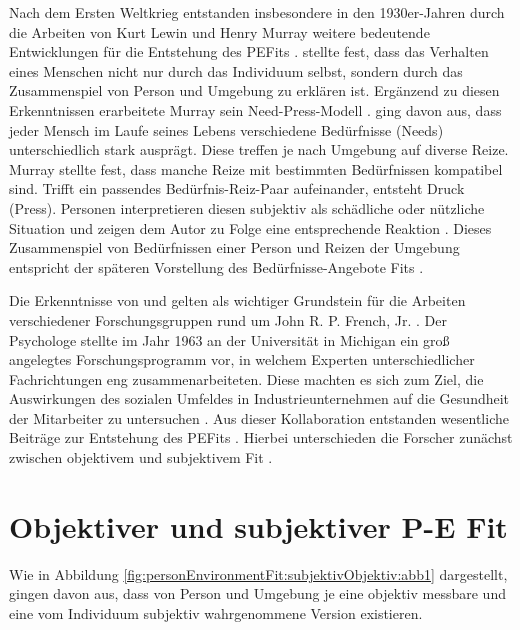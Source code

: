 Nach dem Ersten Weltkrieg entstanden insbesondere in den 1930er-Jahren durch die Arbeiten von Kurt Lewin und Henry Murray weitere bedeutende Entwicklungen für die Entstehung des \acp{PEFit} \cite[S. 1]{edwards:1990}\cite[S. 5]{caplan:1993}. \textcite[S. 11f.]{lewin:1936} stellte fest, dass das Verhalten eines Menschen nicht nur durch das Individuum selbst, sondern durch das Zusammenspiel von Person und Umgebung zu erklären ist. Ergänzend zu diesen Erkenntnissen erarbeitete Murray sein Need-Press-Modell \cite[S. 2]{edwards:2008}. \textcite[S. 38ff.]{murray:1938} ging davon aus, dass jeder Mensch im Laufe seines Lebens verschiedene Bedürfnisse (Needs) unterschiedlich stark ausprägt. Diese treffen je nach Umgebung auf diverse Reize. Murray stellte fest, dass manche Reize mit bestimmten Bedürfnissen kompatibel sind. Trifft ein passendes Bedürfnis-Reiz-Paar aufeinander, entsteht Druck (Press). Personen interpretieren diesen subjektiv als schädliche oder nützliche Situation und zeigen dem Autor zu Folge eine entsprechende Reaktion \cite[S. 38ff.]{murray:1938}. Dieses Zusammenspiel von Bedürfnissen einer Person und Reizen der Umgebung entspricht der späteren Vorstellung des Bedürfnisse-Angebote Fits \cite[S. 8]{edwards:2008}. 

Die Erkenntnisse von \textcite[S. 11f.]{lewin:1936} und \textcite[S. 38ff.]{murray:1938} gelten als wichtiger Grundstein für die Arbeiten verschiedener Forschungsgruppen rund um John R. P. French, Jr. \cite[S. 5]{caplan:1993}. Der Psychologe stellte im Jahr 1963 an der Universität in Michigan ein groß angelegtes Forschungsprogramm vor, in welchem Experten unterschiedlicher Fachrichtungen eng zusammenarbeiteten. Diese machten es sich zum Ziel, die Auswirkungen des sozialen Umfeldes in Industrieunternehmen auf die Gesundheit der Mitarbeiter zu untersuchen \cite[S. 1ff.]{french:1963}. Aus dieser Kollaboration entstanden wesentliche Beiträge zur Entstehung des \acp{PEFit} \cite[S. 4ff.]{caplan:1993}. Hierbei unterschieden die Forscher zunächst zwischen objektivem und subjektivem Fit \cite[S. 4f.]{caplan:1993}\cite[S. 1ff.]{copingAndAdaption:1974}\cite[S. 1ff.]{french:1966}.

\section{Objektiver und subjektiver P-E Fit}
\label{ch:personEnvironmentFit:subjektivObjektiv}
Wie in Abbildung \ref{fig:personEnvironmentFit:subjektivObjektiv:abb1} dargestellt, gingen \textcite[S. 1ff.]{copingAndAdaption:1974} davon aus, dass von Person und Umgebung je eine objektiv messbare und eine vom Individuum subjektiv wahrgenommene Version existieren.

